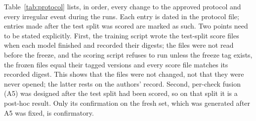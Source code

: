 \documentclass[12pt]{article}
\begin{document}
Table~\ref{tab:protocol} lists, in order, every change to the approved
protocol and every irregular event during the runs. Each entry is dated
in the protocol file; entries made after the test split was scored are
marked as such. Two points need to be stated explicitly. First, the
training script wrote the test-split score files when each model
finished and recorded their digests; the files were not read before the
freeze, and the scoring script refuses to run unless the freeze tag
exists, the frozen files equal their tagged versions and every score
file matches its recorded digest. This shows that the files were not changed, not
that they were never opened; the latter rests on the authors' record.
Second, per-check fusion (A5) was designed after the test split had
been scored, so on that split it is a post-hoc result. Only its
confirmation on the fresh set, which was generated after A5 was fixed,
is confirmatory.
\end{document}
